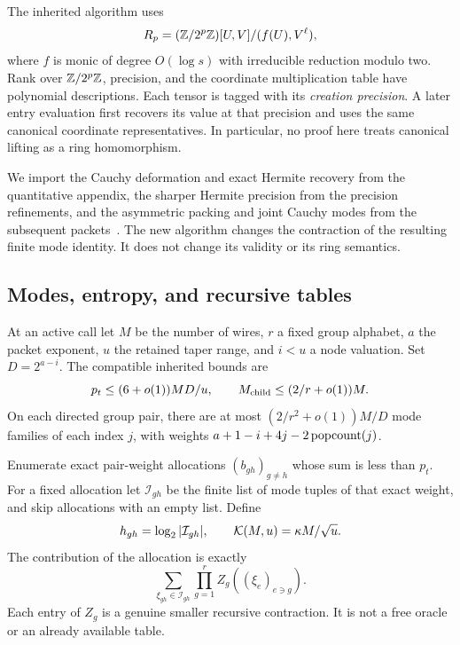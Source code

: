 The inherited algorithm uses
\[
 R_p=(\mathbb Z/2^p\mathbb Z)[U,V]/(f(U),V^\ell),
\]
where $f$ is monic of degree $O(\log s)$ with irreducible reduction
modulo two. Rank over $\mathbb Z/2^p\mathbb Z$, precision, and the coordinate
multiplication table have polynomial descriptions. Each tensor is tagged
with its \emph{creation precision}. A later entry evaluation first recovers
its value at that precision and uses the same canonical coordinate
representatives. In particular, no proof here treats canonical lifting as
a ring homomorphism.

We import the Cauchy deformation and exact Hermite recovery from the
quantitative appendix, the sharper Hermite precision from the precision
refinements, and the asymmetric packing and joint Cauchy modes from the
subsequent packets~\cite{openai,precision,asymmetric,joint,flags,pairwise}.
The new algorithm changes the contraction of the resulting finite mode
identity. It does not change its validity or its ring semantics.

\subsection{Modes, entropy, and recursive tables}

At an active call let $M$ be the number of wires, $r$ a fixed group
alphabet, $a$ the packet exponent, $u$ the retained taper range, and
$i<u$ a node valuation. Set $D=2^{a-i}$. The compatible inherited bounds
are
\begin{equation}\label{eq:modepremises}
 p_t\le(6+o(1))MD/u,\qquad
 M_{\rm child}\le(2/r+o(1))M.
\end{equation}
On each directed group pair, there are at most
$(2/r^2+o(1))M/D$ mode families of each index $j$, with weights
$a+1-i+4j-2\operatorname{popcount}(j)$.

Enumerate exact pair-weight allocations $(b_{gh})_{g\ne h}$ whose sum
is less than $p_t$. For a fixed allocation let $\mathcal I_{gh}$ be the
finite list of mode tuples of that exact weight, and skip allocations with
an empty list. Define
\[
 h_{gh}=\log_2|\mathcal I_{gh}|,
 \qquad \mathcal K(M,u)=\kappa M/\sqrt u.
\]
The contribution of the allocation is exactly
\begin{equation}\label{eq:modeidentity}
 \sum_{\xi_{gh}\in\mathcal I_{gh}}
       \prod_{g=1}^r Z_g((\xi_e)_{e\ni g}).
\end{equation}
Each entry of $Z_g$ is a genuine smaller recursive contraction. It is not
a free oracle or an already available table.

